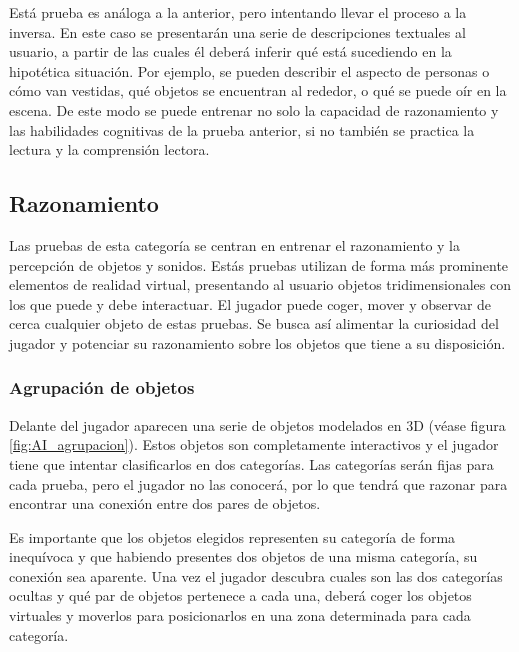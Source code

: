Está prueba es análoga a la anterior, pero intentando llevar el proceso a la inversa. En este caso se presentarán una serie de descripciones textuales al usuario, a partir de las cuales él deberá inferir qué está sucediendo en la hipotética situación. Por ejemplo, se pueden describir el aspecto de personas o cómo van vestidas, qué objetos se encuentran al rededor, o qué se puede oír en la escena. De este modo se puede entrenar no solo la capacidad de razonamiento y las habilidades cognitivas de la prueba anterior, si no también se practica la lectura y la comprensión lectora.




\subsection{Razonamiento}

Las pruebas de esta categoría se centran en entrenar el razonamiento y la percepción de objetos y sonidos. Estás pruebas utilizan de forma más prominente elementos de realidad virtual, presentando al usuario objetos tridimensionales con los que puede y debe interactuar. El jugador puede coger, mover y observar de cerca cualquier objeto de estas pruebas. Se busca así alimentar la curiosidad del jugador y potenciar su razonamiento sobre los objetos que tiene a su disposición.

\subsubsection{Agrupación de objetos}

Delante del jugador aparecen una serie de objetos modelados en 3D (véase figura \ref{fig:AI_agrupacion}). Estos objetos son completamente interactivos y el jugador tiene que intentar clasificarlos en dos categorías. Las categorías serán fijas para cada prueba, pero el jugador no las conocerá, por lo que tendrá que razonar para encontrar una conexión entre dos pares de objetos. 

Es importante que los objetos elegidos representen su categoría de forma inequívoca y que habiendo presentes dos objetos de una misma categoría, su conexión sea aparente. Una vez el jugador descubra cuales son las dos categorías ocultas y qué par de objetos pertenece a cada una, deberá coger los objetos virtuales y moverlos para posicionarlos en una zona determinada para cada categoría. 

